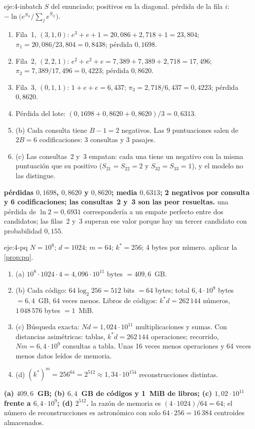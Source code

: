 \begin{solucion}{eje:4-inbatch}
\datos $S$ del enunciado; positivos en la diagonal.
\planteamiento pérdida de la fila $i$: $-\ln\bigl(e^{S_{ii}}/\sum_je^{S_{ij}}\bigr)$.
\pasos
\begin{enumerate}[label=\arabic*.]
  \item Fila~1, $(3,1,0)$: $e^{3}+e+1=20{,}086+2{,}718+1=23{,}804$; $\pi_1=20{,}086/23{,}804=0{,}8438$; pérdida $0{,}1698$.
  \item Fila~2, $(2,2,1)$: $e^{2}+e^{2}+e=7{,}389+7{,}389+2{,}718=17{,}496$; $\pi_2=7{,}389/17{,}496=0{,}4223$; pérdida $0{,}8620$.
  \item Fila~3, $(0,1,1)$: $1+e+e=6{,}437$; $\pi_3=2{,}718/6{,}437=0{,}4223$; pérdida $0{,}8620$.
  \item Pérdida del lote: $(0{,}1698+0{,}8620+0{,}8620)/3=0{,}6313$.
  \item (b) Cada consulta tiene $B-1=2$ negativos. Las 9 puntuaciones salen de $2B=6$ codificaciones: 3 consultas y 3 pasajes.
  \item (c) Las consultas~2 y~3 empatan: cada una tiene un negativo con la misma puntuación que su positivo ($S_{21}=S_{22}=2$ y $S_{32}=S_{33}=1$), y el modelo no las distingue.
\end{enumerate}
\resultado \textbf{pérdidas $0{,}1698$, $0{,}8620$ y $0{,}8620$; media $0{,}6313$; 2 negativos por consulta y 6 codificaciones; las consultas~2 y~3 son las peor resueltas.}
\comprobacion una pérdida de $\ln 2=0{,}6931$ correspondería a un empate perfecto entre dos candidatos; las filas~2 y~3 superan ese valor porque hay un tercer candidato con probabilidad $0{,}155$.
\end{solucion}

\begin{solucion}{eje:4-pq}
\datos $N=10^{8}$; $d=1024$; $m=64$; $k^\ast=256$; 4 bytes por número.
\planteamiento aplicar la \cref{prop:pq}.
\pasos
\begin{enumerate}[label=\arabic*.]
  \item (a) $10^{8}\cdot 1024\cdot 4=4{,}096\cdot 10^{11}$ bytes $=409{,}6$~GB.
  \item (b) Cada código: $64\log_2 256=512$ bits $=64$ bytes; total $6{,}4\cdot 10^{9}$ bytes $=6{,}4$~GB, 64 veces menos. Libros de códigos: $k^\ast d=262\,144$ números, $1\,048\,576$ bytes $=1$~MiB.
  \item (c) Búsqueda exacta: $Nd=1{,}024\cdot 10^{11}$ multiplicaciones y sumas. Con distancias asimétricas: tablas, $k^\ast d=262\,144$ operaciones; recorrido, $Nm=6{,}4\cdot 10^{9}$ consultas a tabla. Unas 16 veces menos operaciones y 64 veces menos datos leídos de memoria.
  \item (d) $(k^\ast)^{m}=256^{64}=2^{512}\approx 1{,}34\cdot 10^{154}$ reconstrucciones distintas.
\end{enumerate}
\resultado \textbf{(a) $409{,}6$~GB; (b) $6{,}4$~GB de códigos y 1~MiB de libros; (c) $1{,}02\cdot 10^{11}$ frente a $6{,}4\cdot 10^{9}$; (d) $2^{512}$.}
\comprobacion la razón de memoria es $(4\cdot 1024)/64=64$; el número de reconstrucciones es astronómico con solo $64\cdot 256=16\,384$ centroides almacenados.
\end{solucion}

